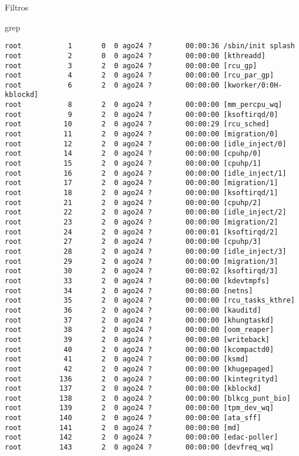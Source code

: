 \begin{section}{Filtros}
\begin{subsection}{grep}
\begin{lstlisting}[style=Ubuntu]
root           1       0  0 ago24 ?        00:00:36 /sbin/init splash
root           2       0  0 ago24 ?        00:00:00 [kthreadd]
root           3       2  0 ago24 ?        00:00:00 [rcu_gp]
root           4       2  0 ago24 ?        00:00:00 [rcu_par_gp]
root           6       2  0 ago24 ?        00:00:00 [kworker/0:0H-kblockd]
root           8       2  0 ago24 ?        00:00:00 [mm_percpu_wq]
root           9       2  0 ago24 ?        00:00:00 [ksoftirqd/0]
root          10       2  0 ago24 ?        00:00:29 [rcu_sched]
root          11       2  0 ago24 ?        00:00:00 [migration/0]
root          12       2  0 ago24 ?        00:00:00 [idle_inject/0]
root          14       2  0 ago24 ?        00:00:00 [cpuhp/0]
root          15       2  0 ago24 ?        00:00:00 [cpuhp/1]
root          16       2  0 ago24 ?        00:00:00 [idle_inject/1]
root          17       2  0 ago24 ?        00:00:00 [migration/1]
root          18       2  0 ago24 ?        00:00:00 [ksoftirqd/1]
root          21       2  0 ago24 ?        00:00:00 [cpuhp/2]
root          22       2  0 ago24 ?        00:00:00 [idle_inject/2]
root          23       2  0 ago24 ?        00:00:00 [migration/2]
root          24       2  0 ago24 ?        00:00:01 [ksoftirqd/2]
root          27       2  0 ago24 ?        00:00:00 [cpuhp/3]
root          28       2  0 ago24 ?        00:00:00 [idle_inject/3]
root          29       2  0 ago24 ?        00:00:00 [migration/3]
root          30       2  0 ago24 ?        00:00:02 [ksoftirqd/3]
root          33       2  0 ago24 ?        00:00:00 [kdevtmpfs]
root          34       2  0 ago24 ?        00:00:00 [netns]
root          35       2  0 ago24 ?        00:00:00 [rcu_tasks_kthre]
root          36       2  0 ago24 ?        00:00:00 [kauditd]
root          37       2  0 ago24 ?        00:00:00 [khungtaskd]
root          38       2  0 ago24 ?        00:00:00 [oom_reaper]
root          39       2  0 ago24 ?        00:00:00 [writeback]
root          40       2  0 ago24 ?        00:00:00 [kcompactd0]
root          41       2  0 ago24 ?        00:00:00 [ksmd]
root          42       2  0 ago24 ?        00:00:00 [khugepaged]
root         136       2  0 ago24 ?        00:00:00 [kintegrityd]
root         137       2  0 ago24 ?        00:00:00 [kblockd]
root         138       2  0 ago24 ?        00:00:00 [blkcg_punt_bio]
root         139       2  0 ago24 ?        00:00:00 [tpm_dev_wq]
root         140       2  0 ago24 ?        00:00:00 [ata_sff]
root         141       2  0 ago24 ?        00:00:00 [md]
root         142       2  0 ago24 ?        00:00:00 [edac-poller]
root         143       2  0 ago24 ?        00:00:00 [devfreq_wq]

\end{lstlisting}
\end{subsection}
\end{section}

